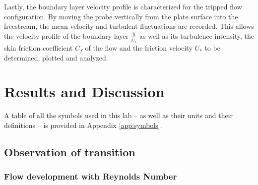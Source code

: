\documentclass{article}
\begin{document}
Lastly, the boundary layer velocity profile is characterized for the tripped flow configuration. By moving the probe vertically from the plate surface into the freestream, the mean velocity and turbulent fluctuations are recorded. This allows the velocity profile of the boundary layer $\frac{\bar{u}}{\bar{U}_{1}}$ as well as its turbulence intensity, the skin friction coefficient $C_f$ of the flow and the friction velocity $U_*$ to be determined, plotted and analyzed.

\section{Results and Discussion}

\begin{center}
    A table of all the symbols used in this lab -- as well as their units and their definitions -- is provided in Appendix \ref{app:symbols}.
\end{center}

\subsection{Observation of transition}

\subsubsection{Flow development with Reynolds Number}
\label{sec: flow development with Reynolds Number}
\end{document}
